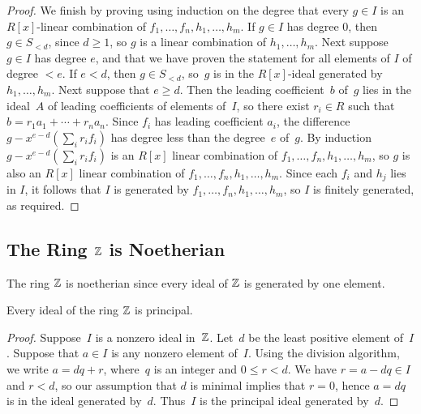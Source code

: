 \begin{proof}
We finish by proving using induction on the degree that every $g\in I$ is an
$R[x]$-linear combination of $f_1,\ldots, f_n, h_1,\ldots, h_m$.
If $g\in I$ has degree $0$, then $g \in S_{<d}$, since $d\geq 1$, so
$g$ is a linear combination of $h_1,\ldots, h_m$.  Next suppose
$g\in I$ has degree $e$, and that we have proven the statement
for all elements of $I$ of degree $<e$.
If $e<d$, then $g\in S_{<d}$, so~$g$ is
in the $R[x]$-ideal generated by $h_1,\ldots, h_m$.  Next suppose
that $e\geq d$.  Then the leading coefficient~$b$
of~$g$ lies in the ideal~$A$ of leading coefficients of elements of~$I$, so there
exist $r_i\in R$ such that $b=r_1 a_1 + \cdots + r_n a_n$.  Since
$f_i$ has leading coefficient $a_i$, the difference $g- x^{e-d} (\sum_i r_i f_i)$ 
has degree less than the degree~$e$ of~$g$.  By induction 
$g-x^{e-d} (\sum_i r_i f_i)$ is an $R[x]$ linear combination of 
$f_1,\ldots, f_n, h_1,\ldots, h_m$, so $g$ is also an $R[x]$ linear combination of
$f_1,\ldots, f_n, h_1,\ldots, h_m$.  Since each $f_i$ and $h_j$ lies in
$I$, it follows that $I$ is generated by $f_1,\ldots, f_n, h_1,\ldots,
h_m$, so $I$ is finitely generated, as required.
\end{proof}

\subsection{The Ring $\mathbb{Z}$ is Noetherian}\label{sec:Znoeth}

The ring $\mathbb{Z}$ is noetherian since every ideal of $\mathbb{Z}$ is
generated by one element.
\begin{proposition}\label{prop:zpid}
	Every ideal of the ring $\mathbb{Z}$ is principal.
\end{proposition}
\begin{proof}
	Suppose~$I$ is a nonzero ideal in~$\mathbb{Z}$. Let~$d$ be the least positive
	element of~$I$.  Suppose that $a\in I$ is any nonzero element of~$I$.
	Using the division algorithm, we write $a=dq + r$, where~$q$ is an
	integer and $0\leq r < d$.  We have $r=a-dq\in I$ and $r<d$, so our
	assumption that $d$ is minimal implies that $r=0$, hence $a=dq$ is in
	the ideal generated by~$d$. Thus~$I$ is the principal ideal generated
	by~$d$.
\end{proof}

